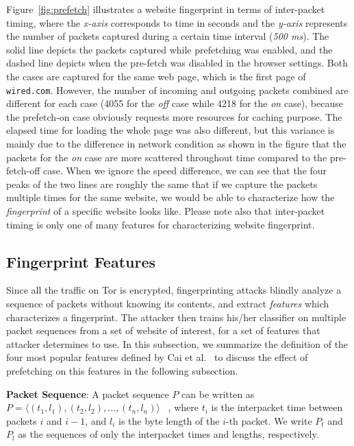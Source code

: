 Figure~\ref{fig:prefetch} illustrates a website fingerprint in terms of inter-packet timing, where the {\it x-axis} corresponds to time in seconds and the {\it y-axis} represents the number of packets captured during a certain time interval ({\it 500 ms}).
The solid line depicts the packets captured while prefetching was enabled, and the dashed line depicts when the pre-fetch was disabled in the browser settings.
Both the cases are captured for the same web page, which is the first page of {\tt wired.com}.
However, the number of incoming and outgoing packets combined are different for each case (4055 for the {\it off} case while 4218 for the {\it on} case), because the prefetch-on case obviously requests more resources for caching purpose. 
The elapsed time for loading the whole page was also different, but this variance is mainly due to the difference in network condition as shown in the figure that the packets for the {\it on} case are more scattered throughout time compared to the pre-fetch-off case.
When we ignore the speed difference, we can see that the four peaks of the two lines are roughly the same that if we capture the packets multiple times for the same website, we would be able to characterize how the {\it fingerprint} of a specific website looks like.
Please note also that inter-packet timing is only one of many features for characterizing website fingerprint.


\subsection{Fingerprint Features}
\label{sec:features}

Since all the traffic on Tor is encrypted, fingerprinting attacks blindly analyze a sequence of packets without knowing its contents, and extract {\it features} which characterizes a fingerprint.
The attacker then trains his/her classifier on multiple packet sequences from a set of website of interest, for a set of features that attacker determines to use.
In this subsection, we summarize the definition of the four most popular features defined by Cai et al.~\cite{Cai:2014kjb} to discuss the effect of prefetching on this features in the following subsection.

{\bf Packet Sequence}:
A packet sequence $P$ can be written as $P = \langle(t_1, l_1), (t_2, l_2), ..., (t_n, l_n)\rangle$ ~\cite{Cai:2014kjb}, where $t_i$ is the interpacket time between packets $i$ and $i-1$, and $l_i$ is the byte length of the $i$-th packet.
We write $P_t$ and $P_l$ as the sequences of only the interpacket times and lengths, respectively.


